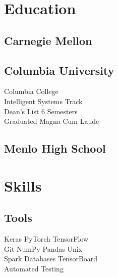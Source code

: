 \documentclass[letterpaper]{deedy-resume} %
\begin{document}
\begin{minipage}[t]{0.33\textwidth} %


\section{Education}

\subsection{Carnegie Mellon}


\sectionspace %
\subsection{Columbia University}
Columbia College \\
Intelligent Systems Track \\
Dean's List 6 Semesters\\
Graduated Magna Cum Laude\\

\sectionspace %


\subsection{Menlo High School}


\sectionspace %


\section{Skills}

\subsection{Tools}
Keras \textbullet{} PyTorch \textbullet{} TensorFlow\\
Git \textbullet{} NumPy \textbullet{} Pandas \textbullet{} Unix\\
Spark \textbullet{} Databases \textbullet {} TensorBoard\\
Automated Testing
\sectionspace

\end{minipage}
\end{document}
